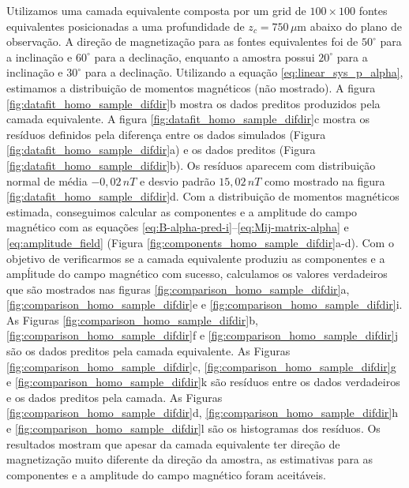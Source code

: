Utilizamos uma camada equivalente composta por um grid de $100 \times 100$ fontes equivalentes posicionadas a uma profundidade de $z_c = 750\, \mu $m abaixo do plano de observação. A direção de magnetização para as fontes equivalentes foi de $50^\circ$ para a inclinação e $60^\circ$ para a declinação, enquanto a amostra possui $20^\circ$ para a inclinação e $30^\circ$ para a declinação. Utilizando a equação \ref{eq:linear_sys_p_alpha}, estimamos a distribuição de momentos magnéticos (não mostrado). A figura \ref{fig:datafit_homo_sample_difdir}b mostra os dados preditos produzidos pela camada equivalente. A figura \ref{fig:datafit_homo_sample_difdir}c mostra os resíduos definidos pela diferença entre os dados simulados (Figura \ref{fig:datafit_homo_sample_difdir}a) e os dados preditos (Figura \ref{fig:datafit_homo_sample_difdir}b). Os resíduos aparecem com distribuição normal de média $-0,02 \, nT$ e desvio padrão $15,02 \, nT$ como mostrado na figura \ref{fig:datafit_homo_sample_difdir}d. Com a distribuição de momentos magnéticos estimada, conseguimos calcular as componentes e a amplitude do campo magnético com as equações \ref{eq:B-alpha-pred-i}--\ref{eq:Mij-matrix-alpha} e \ref{eq:amplitude_field} (Figura \ref{fig:components_homo_sample_difdir}a-d). Com o objetivo de verificarmos se a camada equivalente produziu as componentes e a ampĺitude do campo magnético com sucesso, calculamos os valores verdadeiros que são mostrados nas  figuras \ref{fig:comparison_homo_sample_difdir}a, \ref{fig:comparison_homo_sample_difdir}e e \ref{fig:comparison_homo_sample_difdir}i. As Figuras \ref{fig:comparison_homo_sample_difdir}b, \ref{fig:comparison_homo_sample_difdir}f e \ref{fig:comparison_homo_sample_difdir}j são os dados preditos pela camada equivalente. As Figuras \ref{fig:comparison_homo_sample_difdir}c, \ref{fig:comparison_homo_sample_difdir}g e \ref{fig:comparison_homo_sample_difdir}k são resíduos entre os dados verdadeiros e os dados preditos pela camada. As Figuras \ref{fig:comparison_homo_sample_difdir}d, \ref{fig:comparison_homo_sample_difdir}h e \ref{fig:comparison_homo_sample_difdir}l são os histogramas dos resíduos. Os resultados mostram que apesar da camada equivalente ter direção de magnetização muito diferente da direção da amostra, as estimativas para as componentes e a amplitude do campo magnético foram aceitáveis.  


